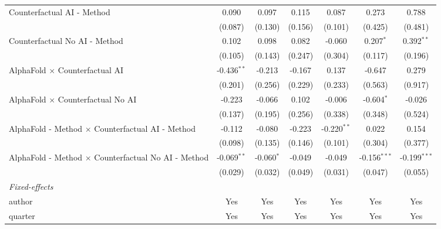 \begin{tabular}{lcccccc}
   Counterfactual AI - Method                                 & 0.090         & 0.097        & 0.115   & 0.087         & 0.273          & 0.788\\   
                                                              & (0.087)       & (0.130)      & (0.156) & (0.101)       & (0.425)        & (0.481)\\   
   Counterfactual No AI - Method                              & 0.102         & 0.098        & 0.082   & -0.060        & 0.207$^{*}$    & 0.392$^{**}$\\   
                                                              & (0.105)       & (0.143)      & (0.247) & (0.304)       & (0.117)        & (0.196)\\   
   AlphaFold $\times$ Counterfactual AI                       & -0.436$^{**}$ & -0.213       & -0.167  & 0.137         & -0.647         & 0.279\\   
                                                              & (0.201)       & (0.256)      & (0.229) & (0.233)       & (0.563)        & (0.917)\\   
   AlphaFold $\times$ Counterfactual No AI                    & -0.223        & -0.066       & 0.102   & -0.006        & -0.604$^{*}$   & -0.026\\   
                                                              & (0.137)       & (0.195)      & (0.256) & (0.338)       & (0.348)        & (0.524)\\   
   AlphaFold - Method $\times$ Counterfactual AI - Method     & -0.112        & -0.080       & -0.223  & -0.220$^{**}$ & 0.022          & 0.154\\   
                                                              & (0.098)       & (0.135)      & (0.146) & (0.101)       & (0.304)        & (0.377)\\   
   AlphaFold - Method $\times$ Counterfactual No AI - Method  & -0.069$^{**}$ & -0.060$^{*}$ & -0.049  & -0.049        & -0.156$^{***}$ & -0.199$^{***}$\\   
                                                              & (0.029)       & (0.032)      & (0.049) & (0.031)       & (0.047)        & (0.055)\\   
   \midrule
   \emph{Fixed-effects}\\
   author                                                     & Yes           & Yes          & Yes     & Yes           & Yes            & Yes\\  
   quarter                                                    & Yes           & Yes          & Yes     & Yes           & Yes            & Yes\\  

\end{tabular}
